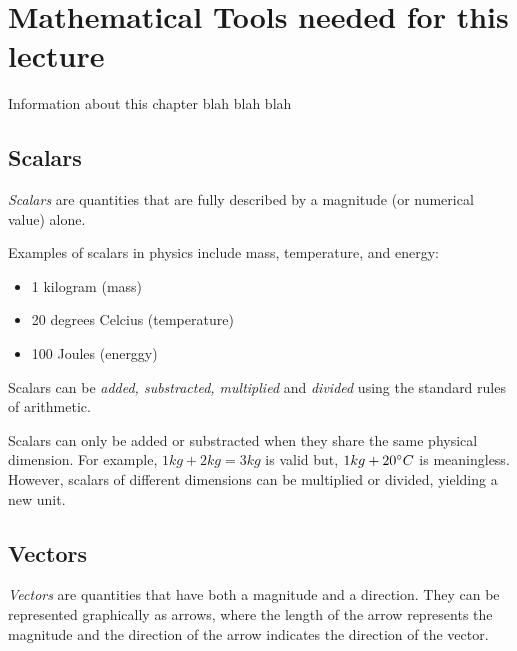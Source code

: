 \documentclass[../main.tex]{subfiles}
\begin{document}
\chapter{Mathematical Tools needed for this lecture}
Information about this chapter blah blah blah

\section{Scalars}
\emph{Scalars} are quantities that are fully described by a magnitude (or numerical value) alone. 

Examples of scalars in physics include mass, temperature, and energy:

\begin{itemize}
	\item 1 kilogram (mass)
	\item 20 degrees Celcius (temperature)
	\item 100 Joules (energgy)
\end{itemize}

Scalars can be \emph{added, substracted, multiplied} and \emph{divided} using the standard rules of arithmetic.\par
Scalars can only be added or substracted when they share the same physical dimension. For example, \( 1kg + 2kg = 3kg\) is valid but, \(1kg + 20\degree C\) is meaningless. However, scalars of different dimensions can be multiplied or divided, yielding a new unit.

\section{Vectors}

\emph{Vectors} are quantities that have both a magnitude and a direction. They can be represented graphically as arrows, where the length of the arrow represents the magnitude and the direction of the arrow indicates the direction of the vector. 

\begin{figure}[h]
\centering
{}
\end{figure}
\end{document}
